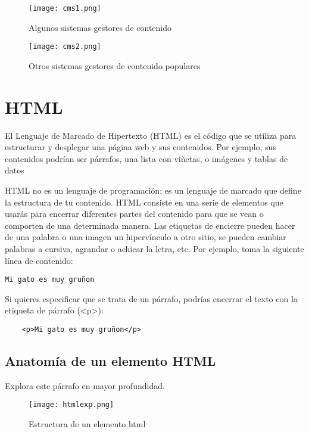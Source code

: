 \begin{figure}[H]
	\center
	\texttt{[image: cms1.png]}
	\caption{Algunos sistemas gestores de contenido}
	\label{fig:super}
\end{figure}

\begin{figure}[H]
	\center
	\texttt{[image: cms2.png]}
	\caption{Otros sistemas gestores de contenido populares}
	\label{fig:super}
\end{figure}

\section{HTML}

\cite{mdn} El Lenguaje de Marcado de Hipertexto (HTML) es el código que se utiliza para estructurar y desplegar una página web y sus contenidos. Por ejemplo, sus contenidos podrían ser párrafos, una lista con viñetas, o imágenes y tablas de datos

HTML no es un lenguaje de programación; es un lenguaje de marcado que define la estructura de tu contenido. HTML consiste en una serie de elementos que usarás para encerrar diferentes partes del contenido para que se vean o comporten de una determinada manera. Las etiquetas de encierre pueden hacer de una palabra o una imagen un hipervínculo a otro sitio, se pueden cambiar palabras a cursiva, agrandar o achicar la letra, etc. Por ejemplo, toma la siguiente línea de contenido:

\begin{lstlisting}
Mi gato es muy gruñon
\end{lstlisting}

Si quieres especificar que se trata de un párrafo, podrías encerrar el texto con la etiqueta de párrafo (<p>):

\begin{lstlisting}
	<p>Mi gato es muy gruñon</p>
\end{lstlisting}

\subsection{Anatomía de un elemento HTML}
Explora este párrafo en mayor profundidad.

\begin{figure}[H]
	\center
	\texttt{[image: htmlexp.png]}
	\caption{Estructura de un elemento html}
\end{figure}

